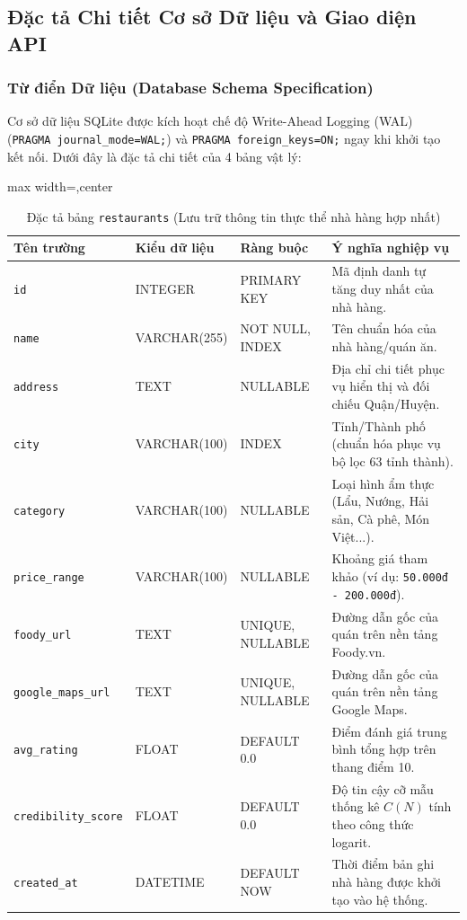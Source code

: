 \documentclass[12pt, a4paper]{article}
\begin{document}
\newpage
\subsection{Đặc tả Chi tiết Cơ sở Dữ liệu và Giao diện API}

\subsubsection{Từ điển Dữ liệu (Database Schema Specification)}
Cơ sở dữ liệu SQLite được kích hoạt chế độ Write-Ahead Logging (WAL) \cite{hipp2024sqlite} (\texttt{PRAGMA journal\_mode=WAL;}) và \texttt{PRAGMA foreign\_keys=ON;} ngay khi khởi tạo kết nối. Dưới đây là đặc tả chi tiết của 4 bảng vật lý:

\begin{table}[!htbp]
\centering
\caption{Đặc tả bảng \texttt{restaurants} (Lưu trữ thông tin thực thể nhà hàng hợp nhất)}
\vspace{0.15cm}
\footnotesize
\begin{adjustbox}{max width=\textwidth,center}
\begin{tabularx}{0.97\textwidth}{l l l X}
\toprule
\rowcolor{blue!8}
\textbf{Tên trường} & \textbf{Kiểu dữ liệu} & \textbf{Ràng buộc} & \textbf{Ý nghĩa nghiệp vụ} \\
\midrule
\texttt{id} & INTEGER & PRIMARY KEY & Mã định danh tự tăng duy nhất của nhà hàng. \\
\texttt{name} & VARCHAR(255) & NOT NULL, INDEX & Tên chuẩn hóa của nhà hàng/quán ăn. \\
\texttt{address} & TEXT & NULLABLE & Địa chỉ chi tiết phục vụ hiển thị và đối chiếu Quận/Huyện. \\
\texttt{city} & VARCHAR(100) & INDEX & Tỉnh/Thành phố (chuẩn hóa phục vụ bộ lọc 63 tỉnh thành). \\
\texttt{category} & VARCHAR(100) & NULLABLE & Loại hình ẩm thực (Lẩu, Nướng, Hải sản, Cà phê, Món Việt...). \\
\texttt{price\_range} & VARCHAR(100) & NULLABLE & Khoảng giá tham khảo (ví dụ: \texttt{50.000đ - 200.000đ}). \\
\texttt{foody\_url} & TEXT & UNIQUE, NULLABLE & Đường dẫn gốc của quán trên nền tảng Foody.vn. \\
\texttt{google\_maps\_url} & TEXT & UNIQUE, NULLABLE & Đường dẫn gốc của quán trên nền tảng Google Maps. \\
\texttt{avg\_rating} & FLOAT & DEFAULT 0.0 & Điểm đánh giá trung bình tổng hợp trên thang điểm 10. \\
\texttt{credibility\_score} & FLOAT & DEFAULT 0.0 & Độ tin cậy cỡ mẫu thống kê $C(N)$ tính theo công thức logarit. \\
\texttt{created\_at} & DATETIME & DEFAULT NOW & Thời điểm bản ghi nhà hàng được khởi tạo vào hệ thống. \\
\bottomrule
\end{tabularx}
\end{adjustbox}
\end{table}
\end{document}
